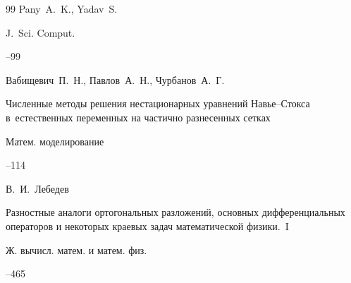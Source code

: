 \begin{thebibliography}{99}
\by Pany~A.~K., Yadav~S.


\jour J.~Sci. Comput.



--99








\by Вабищевич~П.~Н., Павлов~А.~Н., Чурбанов~А.~Г.

\paper Численные методы решения нестационарных уравнений Навье--Стокса в~естественных переменных на частично разнесенных сетках

\jour Матем. моделирование




--114









\by В.~И.~Лебедев

\paper Разностные аналоги ортогональных разложений, основных дифференциальных операторов и некоторых краевых задач математической физики.~I

\jour Ж. вычисл. матем. и матем. физ.




--465



















\end{thebibliography}
